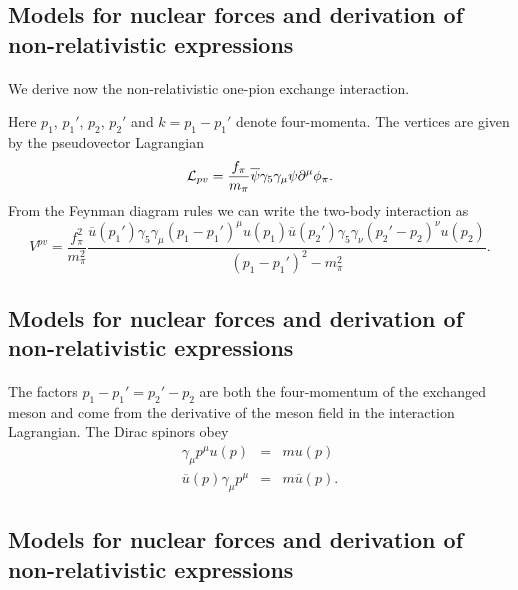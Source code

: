 \documentclass[%
twoside,                 %
final,                   %
10pt]{article}
\begin{document}
\subsection*{Models for nuclear forces and derivation of non-relativistic expressions}

\paragraph{}
We derive now the non-relativistic one-pion exchange interaction.

Here $p_{1}$, $p_{1}'$, $p_{2}$, $p_{2}'$ and $k=p_{1}-p_{1}'$ denote 
four-momenta.  
The vertices are 
given by the pseudovector Lagrangian
\[
{\cal L}_{pv}=\frac{f_{\pi}}{m_{\pi}}\overline{\psi}\gamma_{5}\gamma_{\mu}
\psi\partial^{\mu}\phi_{\pi}.
\]
 From the Feynman diagram rules we can write the two-body interaction as  
\[
V^{pv}=\frac{f_{\pi}^{2}}{m_{\pi}^{2}}\frac{\overline{u}(p_{1}')\gamma_{5}
\gamma_{\mu}(p_{1}-p_{1}')^{\mu}u(p_{1})\overline{u}(p_{2}')\gamma_{5}
\gamma_{\nu}(p_{2}'-p_{2})^{\nu}u(p_{2})}{(p_{1}-p_{1}')^{2}-m_{\pi}^{2}}.
\]



\subsection*{Models for nuclear forces and derivation of non-relativistic expressions}

\paragraph{}
The factors $p_{1}-p_{1}'=p_{2}'-p_{2}$ are both the four-momentum of the 
exchanged meson and come from the derivative of the meson field in 
the interaction Lagrangian. 
The Dirac spinors obey 
\begin{eqnarray*}
\gamma_{\mu}p^{\mu}u(p)&=&mu(p) \nonumber \\
\overline{u}(p)\gamma_{\mu}p^{\mu}&=&m\overline{u}(p). \nonumber
\end{eqnarray*}



\subsection*{Models for nuclear forces and derivation of non-relativistic expressions}
\end{document}
